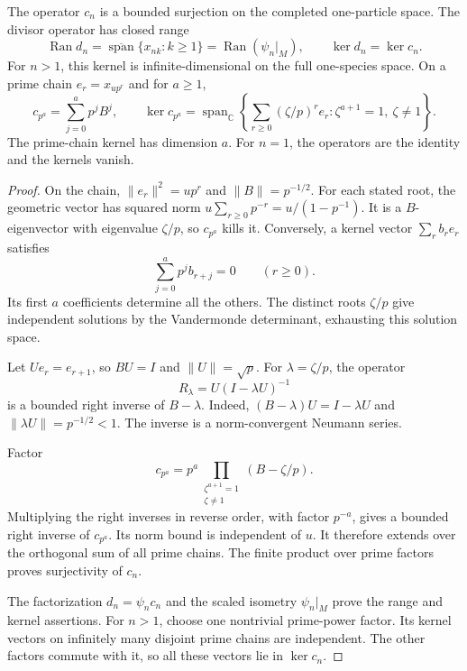 \begin{theorem}
\label{v4-arith:hecke:thm:hilbert-kernel}
The operator $c_n$ is a bounded surjection on the completed
one-particle space. The divisor operator has closed range
\[
 \operatorname{Ran}d_n
 =\overline{\operatorname{span}}\{x_{nk}:k\geq1\}
 =\operatorname{Ran}(\psi_n|_M),\qquad
 \ker d_n=\ker c_n.
\]
For $n>1$, this kernel is infinite-dimensional on the full
one-species space.
On a prime chain $e_r=x_{up^r}$ and for $a\geq1$,
\[
 c_{p^a}=\sum_{j=0}^ap^jB^j,
 \qquad
 \ker c_{p^a}=\operatorname{span}_{\mathbb C}
 \left\{\sum_{r\geq0}(\zeta/p)^re_r:
       \zeta^{a+1}=1,\ \zeta\ne1\right\}.
\]
The prime-chain kernel has dimension $a$.
For $n=1$, the operators are the identity and the kernels vanish.
\end{theorem}
\begin{proof}
On the chain, $\|e_r\|^2=up^r$ and $\|B\|=p^{-1/2}$.
For each stated root, the geometric vector has squared norm
$u\sum_{r\geq0}p^{-r}=u/(1-p^{-1})$.
It is a $B$-eigenvector with eigenvalue $\zeta/p$,
so $c_{p^a}$ kills it.
Conversely, a kernel vector $\sum_rb_re_r$ satisfies
\[
 \sum_{j=0}^ap^jb_{r+j}=0\qquad(r\geq0).
\]
Its first $a$ coefficients determine all the others.
The distinct roots $\zeta/p$ give independent solutions by the
Vandermonde determinant, exhausting this solution space.

Let $Ue_r=e_{r+1}$, so $BU=I$ and $\|U\|=\sqrt p$.
For $\lambda=\zeta/p$, the operator
\[
 R_\lambda=U(I-\lambda U)^{-1}
\]
is a bounded right inverse of $B-\lambda$.
Indeed, $(B-\lambda)U=I-\lambda U$ and
$\|\lambda U\|=p^{-1/2}<1$.
The inverse is a norm-convergent Neumann series.

Factor
\[
 c_{p^a}=p^a\prod_{\substack{\zeta^{a+1}=1\\\zeta\ne1}}(B-\zeta/p).
\]
Multiplying the right inverses in reverse order, with factor $p^{-a}$,
gives a bounded right inverse of $c_{p^a}$.
Its norm bound is independent of $u$.
It therefore extends over the orthogonal sum of all prime chains.
The finite product over prime factors proves surjectivity of $c_n$.

The factorization $d_n=\psi_nc_n$ and the scaled isometry
$\psi_n|_M$ prove the range and kernel assertions.
For $n>1$, choose one nontrivial prime-power factor.
Its kernel vectors on infinitely many disjoint prime chains are independent.
The other factors commute with it, so all these vectors lie in $\ker c_n$.
\end{proof}

